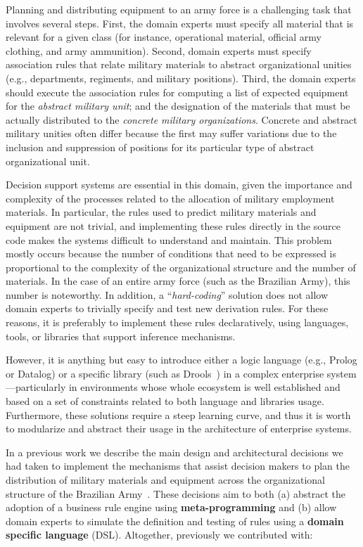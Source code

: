 \documentclass[twocolumn]{bmcart}%
\begin{document}
Planning and distributing equipment to an army force is a
  challenging task that involves several steps. First, the
  domain experts must specify all material that is relevant
  for a given class (for instance, operational material, official army clothing,
  and army ammunition). Second, domain experts must specify association 
rules that relate military materials to abstract 
organizational unities (e.g., departments, regiments,
and military positions). Third, the domain experts should 
execute the association rules for computing a list of expected
equipment for the \emph{abstract military unit}; and the
designation of the materials that must be
actually distributed to the \emph{concrete military organizations}. Concrete and
abstract military unities often differ because the first may suffer
variations due to the inclusion and suppression of positions
for its particular type of abstract organizational unit.

Decision support systems are essential in this domain, given the importance and complexity of the processes related to the allocation of military employment materials. In particular, the rules used to predict military materials and equipment are not trivial, and implementing these rules directly in the source code makes the systems difficult to understand and maintain. This problem mostly occurs because the number of conditions that need to be expressed is proportional to the complexity of the organizational structure and the number of materials. In the case of an entire army force (such as the Brazilian Army), this number is noteworthy. In addition, a ``\emph{hard-coding}'' solution does not allow domain experts to trivially specify and test new derivation rules. For these reasons, it is preferably to implement these rules declaratively, using languages, tools, or libraries that
support inference mechanisms.

However, it is anything but easy to introduce either a logic language (e.g., Prolog or Datalog) or a specific library (such as Drools~\cite{browne2009}) in a complex enterprise system---particularly in environments whose whole ecosystem is well established and based on a set of constraints related to both language and libraries usage. Furthermore, these solutions require a steep learning curve, and thus it is worth to modularize and abstract their usage in the architecture of enterprise systems.

In a previous work we describe the main design and architectural decisions we had taken to implement the mechanisms that assist decision makers to plan the distribution of military materials and equipment across the organizational structure of the Brazilian Army~\cite{phtcosta:sbcars}. These decisions aim to both (a) abstract the adoption of a business rule engine using {\bf meta-programming} and (b) allow domain experts to simulate the definition and testing of rules using a {\bf domain specific language} (DSL). Altogether, previously we contributed with:
\end{document}
